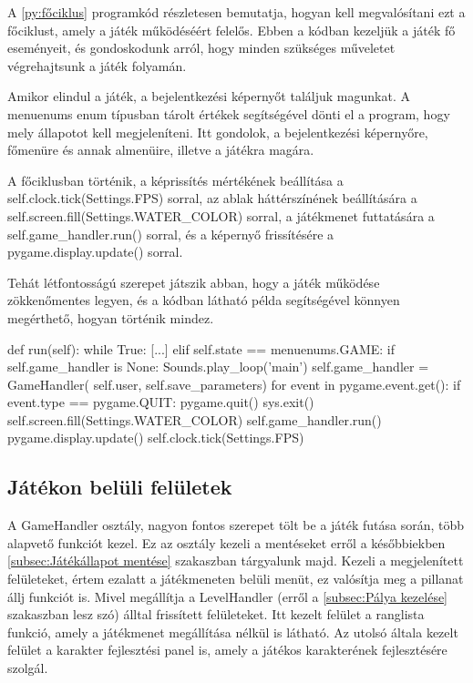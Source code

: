 A \ref{py:főciklus} programkód részletesen bemutatja, hogyan kell megvalósítani ezt a főciklust, amely a játék működéséért felelős. Ebben a kódban kezeljük a játék fő eseményeit, és gondoskodunk arról, hogy minden szükséges műveletet végrehajtsunk a játék folyamán.

Amikor elindul a játék, a bejelentkezési képernyőt találjuk magunkat. A menuenums enum típusban tárolt értékek segítségével dönti el a program, hogy mely állapotot kell megjeleníteni. Itt gondolok, a bejelentkezési képernyőre, főmenüre és annak almenüire, illetve a játékra magára. 

A főciklusban történik, a képrissítés mértékének beállítása a self.clock.tick(Settings.FPS) sorral, az ablak háttérszínének beállítására a self.screen.fill(Settings.WATER\_COLOR) sorral, a játékmenet futtatására a self.game\_handler.run() sorral, és a képernyő frissítésére a pygame.display.update() sorral.

Tehát létfontosságú szerepet játszik abban, hogy a játék működése zökkenőmentes legyen, és a kódban látható példa segítségével könnyen megérthető, hogyan történik mindez.


\begin{python}[caption={Játék főciklusa},label=py:főciklus]
    def run(self):
        while True:
            [...]
            elif self.state == menuenums.GAME:
                if self.game_handler is None:
                    Sounds.play_loop('main')
                    self.game_handler = GameHandler(
                        self.user, self.save_parameters)
                for event in pygame.event.get():
                    if event.type == pygame.QUIT:
                        pygame.quit()
                        sys.exit()
                self.screen.fill(Settings.WATER_COLOR)
                self.game_handler.run()
                pygame.display.update()
                self.clock.tick(Settings.FPS)
\end{python}

\subsection{Játékon belüli felületek} \label{subsec:A játék fő osztálya}
\indent \indent A GameHandler osztály, nagyon fontos szerepet tölt be a játék futása során, több alapvető funkciót kezel. Ez az osztály kezeli a mentéseket erről a későbbiekben \ref{subsec:Játékállapot mentése} szakaszban tárgyalunk majd. 
Kezeli a megjelenített felületeket, értem ezalatt a játékmeneten belüli menüt, ez valósítja meg a pillanat állj funkciót is. Mivel megállítja a LevelHandler (erről a \ref{subsec:Pálya kezelése} szakaszban lesz szó) álltal frissített felületeket. Itt kezelt felület a ranglista funkció, amely a játékmenet megállítása nélkül is látható. Az utolsó általa kezelt felület a karakter fejlesztési panel is, amely a játékos karakterének fejlesztésére szolgál.

